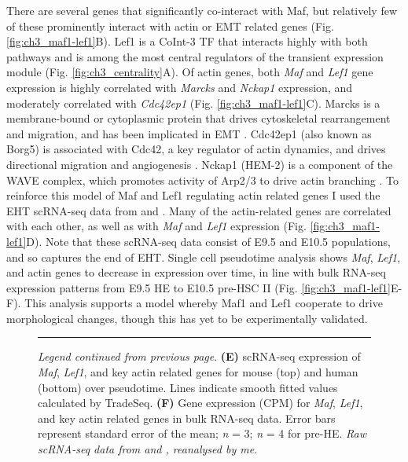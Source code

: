 There are several genes that significantly co-interact with Maf, but relatively few of these prominently interact with actin or EMT related genes (Fig. \ref{fig:ch3_maf1-lef1}B). Lef1 is a CoInt-3 TF that interacts highly with both pathways and is among the most central regulators of the transient expression module (Fig. \ref{fig:ch3_centrality}A). Of actin genes, both \textit{Maf} and \textit{Lef1} gene expression is highly correlated with \textit{Marcks} and \textit{Nckap1} expression, and moderately correlated with \textit{Cdc42ep1} (Fig. \ref{fig:ch3_maf1-lef1}C). Marcks is a membrane-bound or cytoplasmic protein that drives cytoskeletal rearrangement and migration, and has been implicated in EMT \citep{el_amri_marcks_2018, xiang_myristoylated_2019}. Cdc42ep1 (also known as Borg5) is associated with Cdc42, a key regulator of actin dynamics, and drives directional migration and angiogenesis \citep{liu_borg5_2014, farrugia_borg_2016, watson_cdc42_2016}. Nckap1 (HEM-2) is a component of the WAVE complex, which promotes activity of Arp2/3 to drive actin branching \citep{chen_structure_2010, chen_wave_2014}. To reinforce this model of Maf and Lef1 regulating actin related genes I used the EHT scRNA-seq data from \cite{zhu_developmental_2020} and \cite{zeng_tracing_2019}. Many of the actin-related genes are correlated with each other, as well as with \textit{Maf} and \textit{Lef1} expression (Fig. \ref{fig:ch3_maf1-lef1}D). Note that these scRNA-seq data consist of E9.5 and E10.5 populations, and so captures the end of EHT. Single cell pseudotime analysis shows \textit{Maf}, \textit{Lef1}, and actin genes to decrease in expression over time, in line with bulk RNA-seq expression patterns from E9.5 HE to E10.5 pre-HSC II (Fig. \ref{fig:ch3_maf1-lef1}E-F). This analysis supports a model whereby Maf1 and Lef1 cooperate to drive morphological changes, though this has yet to be experimentally validated. 
\begin{figure}[!t]
    \ContinuedFloat
    \hrule
    \vspace{5mm}
    \caption[]
    {\textit{Legend continued from previous page}. \textbf{(E)} scRNA-seq expression of \textit{Maf}, \textit{Lef1}, and key actin related genes for mouse (top) and human (bottom) over pseudotime. Lines indicate smooth fitted values calculated by TradeSeq. 
    \textbf{(F)} Gene expression (CPM) for \textit{Maf}, \textit{Lef1}, and key actin related genes in bulk RNA-seq data. Error bars represent standard error of the mean; \textit{n} = 3; \textit{n} = 4 for pre-HE. 
    \textit{Raw scRNA-seq data from \cite{zhu_developmental_2020} and \cite{zeng_tracing_2019}, reanalysed by me.} 
    }
\end{figure}
\vspace*{3in}

